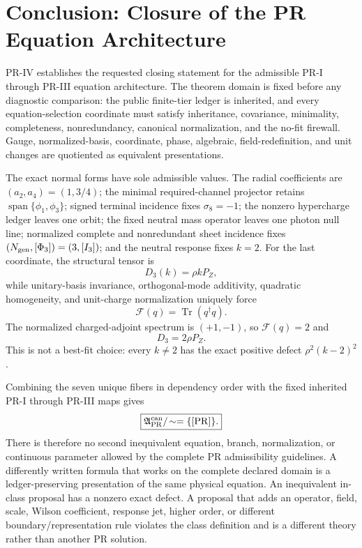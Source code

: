 \section{Conclusion: Closure of the PR Equation Architecture}
\label{sec:conclusion}

PR-IV establishes the requested closing statement for the admissible PR-I through PR-III equation architecture.  The theorem domain is fixed before any diagnostic comparison: the public finite-tier ledger is inherited, and every equation-selection coordinate must satisfy inheritance, covariance,
minimality, completeness, nonredundancy, canonical normalization, and the no-fit firewall.  Gauge, normalized-basis, coordinate, phase, algebraic, field-redefinition, and unit changes are quotiented as equivalent presentations.

The exact normal forms have sole admissible values.  The radial coefficients are $(a_2,a_4)=(1,3/4)$; the minimal required-channel projector retains $\operatorname{span}\{\phi_1,\phi_3\}$; signed terminal incidence fixes $\sigma_8=-1$; the nonzero hypercharge ledger leaves one orbit; the fixed
neutral mass operator leaves one photon null line; normalized complete and nonredundant sheet incidence fixes $(N_{\rm gen},[\Phi_3])=(3,[I_3])$; and the neutral response fixes $k=2$.
For the last coordinate, the structural tensor is
\begin{equation}
 D_3(k)=\rho kP_Z,
\end{equation}
while unitary-basis invariance, orthogonal-mode additivity, quadratic homogeneity, and unit-charge normalization uniquely force
\begin{equation}
 \mathcal F(q)=\operatorname{Tr}(q^\dagger q).
\end{equation}
The normalized charged-adjoint spectrum is $(+1,-1)$, so
$\mathcal F(q)=2$ and
\begin{equation}
 \boxed{D_3=2\rho P_Z.}
\end{equation}
This is not a best-fit choice: every $k\ne2$ has the exact positive defect
$\rho^2(k-2)^2$.

Combining the seven unique fibers in dependency order with the fixed inherited PR-I through PR-III maps gives
\begin{equation}
 \boxed{
 \mathfrak A_{\rm PR}^{\rm can}/\!\sim
 =\{[\mathrm{PR}]\}.}
\end{equation}
There is therefore no second inequivalent equation, branch, normalization, or continuous parameter allowed by the complete PR admissibility guidelines.  A differently written formula that works on the complete declared domain is a ledger-preserving presentation of the same physical equation.  An inequivalent in-class proposal has a nonzero exact defect.  A proposal that adds an operator, field, scale, Wilson \cite{Wilson_1975} coefficient, response jet, higher order, or different boundary/representation rule violates the class definition and is a different theory rather than another PR solution.

